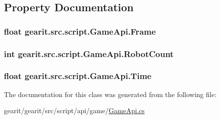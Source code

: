 \subsection{Property Documentation}
\hypertarget{classgearit_1_1src_1_1script_1_1_game_api_af5db6ace21fae68628f334a5e6351198}{
\subsubsection[{Frame}]{\setlength{\rightskip}{0pt plus 5cm}float gearit.\+src.\+script.\+Game\+Api.\+Frame\hspace{0.3cm}{\ttfamily [get]}}}\label{classgearit_1_1src_1_1script_1_1_game_api_af5db6ace21fae68628f334a5e6351198}
\hypertarget{classgearit_1_1src_1_1script_1_1_game_api_a91c29ec861456250febb94f04e86f4c4}{
\subsubsection[{Robot\+Count}]{\setlength{\rightskip}{0pt plus 5cm}int gearit.\+src.\+script.\+Game\+Api.\+Robot\+Count\hspace{0.3cm}{\ttfamily [get]}}}\label{classgearit_1_1src_1_1script_1_1_game_api_a91c29ec861456250febb94f04e86f4c4}
\hypertarget{classgearit_1_1src_1_1script_1_1_game_api_a285fb90fb252459338255542d80bd144}{
\subsubsection[{Time}]{\setlength{\rightskip}{0pt plus 5cm}float gearit.\+src.\+script.\+Game\+Api.\+Time\hspace{0.3cm}{\ttfamily [get]}}}\label{classgearit_1_1src_1_1script_1_1_game_api_a285fb90fb252459338255542d80bd144}


The documentation for this class was generated from the following file\+:\begin{DoxyCompactItemize}
\item 
gearit/gearit/src/script/api/game/\hyperlink{_game_api_8cs}{Game\+Api.\+cs}\end{DoxyCompactItemize}
